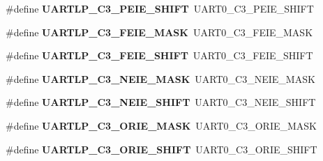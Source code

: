 \begin{DoxyCompactItemize}
\#define {\bfseries U\+A\+R\+T\+L\+P\+\_\+\+C3\+\_\+\+P\+E\+I\+E\+\_\+\+S\+H\+I\+FT}~U\+A\+R\+T0\+\_\+\+C3\+\_\+\+P\+E\+I\+E\+\_\+\+S\+H\+I\+FT
\item 
\mbox{\label{group___backward___compatibility___symbols_ga06e90c952858ab6b2a6e8fec451fed4a}} 
\#define {\bfseries U\+A\+R\+T\+L\+P\+\_\+\+C3\+\_\+\+F\+E\+I\+E\+\_\+\+M\+A\+SK}~U\+A\+R\+T0\+\_\+\+C3\+\_\+\+F\+E\+I\+E\+\_\+\+M\+A\+SK
\item 
\mbox{\label{group___backward___compatibility___symbols_ga47332e2095915eede18d8b2e44bc08d3}} 
\#define {\bfseries U\+A\+R\+T\+L\+P\+\_\+\+C3\+\_\+\+F\+E\+I\+E\+\_\+\+S\+H\+I\+FT}~U\+A\+R\+T0\+\_\+\+C3\+\_\+\+F\+E\+I\+E\+\_\+\+S\+H\+I\+FT
\item 
\mbox{\label{group___backward___compatibility___symbols_ga5b1c0f5de0179b86f7efd474133a5838}} 
\#define {\bfseries U\+A\+R\+T\+L\+P\+\_\+\+C3\+\_\+\+N\+E\+I\+E\+\_\+\+M\+A\+SK}~U\+A\+R\+T0\+\_\+\+C3\+\_\+\+N\+E\+I\+E\+\_\+\+M\+A\+SK
\item 
\mbox{\label{group___backward___compatibility___symbols_gaa8aa79a21c751f77d27f76e62753bf9f}} 
\#define {\bfseries U\+A\+R\+T\+L\+P\+\_\+\+C3\+\_\+\+N\+E\+I\+E\+\_\+\+S\+H\+I\+FT}~U\+A\+R\+T0\+\_\+\+C3\+\_\+\+N\+E\+I\+E\+\_\+\+S\+H\+I\+FT
\item 
\mbox{\label{group___backward___compatibility___symbols_gaa9293d3cac47a88e5be264b21e110bfd}} 
\#define {\bfseries U\+A\+R\+T\+L\+P\+\_\+\+C3\+\_\+\+O\+R\+I\+E\+\_\+\+M\+A\+SK}~U\+A\+R\+T0\+\_\+\+C3\+\_\+\+O\+R\+I\+E\+\_\+\+M\+A\+SK
\item 
\mbox{\label{group___backward___compatibility___symbols_gad69f41c3e7e8bd2086748eb86a967220}} 
\#define {\bfseries U\+A\+R\+T\+L\+P\+\_\+\+C3\+\_\+\+O\+R\+I\+E\+\_\+\+S\+H\+I\+FT}~U\+A\+R\+T0\+\_\+\+C3\+\_\+\+O\+R\+I\+E\+\_\+\+S\+H\+I\+FT
\item 
\mbox{\label{group___backward___compatibility___symbols_gad07163dc482ca87cdab056c680c081c2}} 

\end{DoxyCompactItemize}
